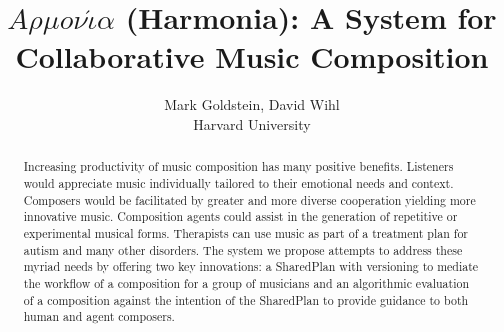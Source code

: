 \documentclass[final,authoryear,5p,times,twocolumn]{elsarticle}
\begin{document}
\begin{frontmatter}



\title{$A \rho \mu o \nu \acute{\iota} \alpha$ (Harmonia): A System for Collaborative Music Composition}


\author{{\rm Mark Goldstein, David Wihl}\\ Harvard University}
\address{\normalsize\{markgoldstein,davidwihl\}@g.harvard.edu}

\begin{abstract}

Increasing productivity of music composition has many positive benefits. Listeners would appreciate music individually tailored to their emotional needs and context. Composers would be facilitated by greater and more diverse cooperation yielding more innovative music. Composition agents could assist in the generation of repetitive or  experimental musical forms. Therapists can use music as part of a treatment plan  for autism and many other disorders. The system we propose attempts to address these myriad needs  by offering two key innovations: a SharedPlan with versioning to mediate the workflow of a composition for a group of musicians and an algorithmic evaluation of a composition against the intention of the SharedPlan to provide guidance to both human and agent composers.

\end{abstract}

\end{frontmatter}
\end{document}
